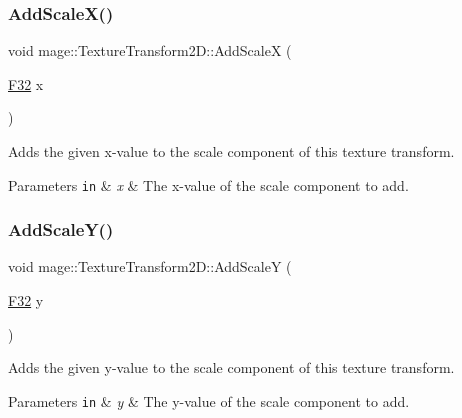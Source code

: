 \subsubsection{\texorpdfstring{Add\+Scale\+X()}{AddScaleX()}}
{\footnotesize\ttfamily void mage\+::\+Texture\+Transform2\+D\+::\+Add\+ScaleX (\begin{DoxyParamCaption}\item[{\mbox{\hyperlink{namespacemage_aa97e833b45f06d60a0a9c4fc22ae02c0}{F32}}}]{x }\end{DoxyParamCaption})\hspace{0.3cm}{\ttfamily [noexcept]}}

Adds the given x-\/value to the scale component of this texture transform.


\begin{DoxyParams}[1]{Parameters}
\mbox{\tt in}  & {\em x} & The x-\/value of the scale component to add. \\
\hline
\end{DoxyParams}
\mbox{\label{classmage_1_1_texture_transform2_d_a92c9e33b28679a8cc250a76a2c684e74}} 
\subsubsection{\texorpdfstring{Add\+Scale\+Y()}{AddScaleY()}}
{\footnotesize\ttfamily void mage\+::\+Texture\+Transform2\+D\+::\+Add\+ScaleY (\begin{DoxyParamCaption}\item[{\mbox{\hyperlink{namespacemage_aa97e833b45f06d60a0a9c4fc22ae02c0}{F32}}}]{y }\end{DoxyParamCaption})\hspace{0.3cm}{\ttfamily [noexcept]}}

Adds the given y-\/value to the scale component of this texture transform.


\begin{DoxyParams}[1]{Parameters}
\mbox{\tt in}  & {\em y} & The y-\/value of the scale component to add. \\
\hline
\end{DoxyParams}
\mbox{\label{classmage_1_1_texture_transform2_d_a6100f5884c287a2ae1d3fd20bcab465b}} 
